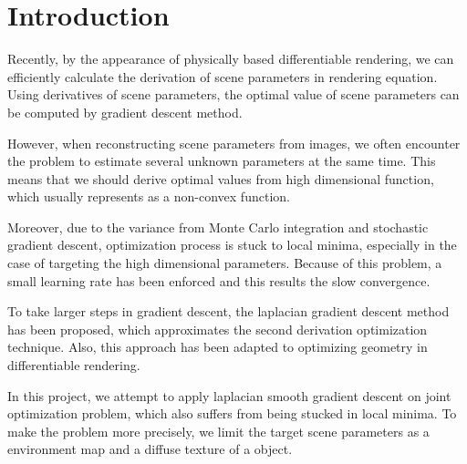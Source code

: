 \section*{Introduction}\label{ch:ch1label}

Recently, by the appearance of physically based differentiable rendering, we can efficiently calculate the derivation of scene parameters in rendering equation. Using derivatives of scene parameters, the optimal value of scene parameters can be computed by gradient descent method. 

However, when reconstructing scene parameters from images, we often encounter the problem to estimate several unknown parameters at the same time. This means that we should derive optimal values from high dimensional function, which usually represents as a non-convex function.

Moreover, due to the variance from Monte Carlo integration and stochastic gradient descent, optimization process is stuck to local minima, especially in the case of targeting the high dimensional parameters. Because of this problem, a small learning rate has been enforced and this results the slow convergence.

To take larger steps in gradient descent, the laplacian gradient descent method has been proposed, which approximates the second derivation optimization technique\cite{osher2018laplacian}.
Also, this approach has been adapted to optimizing geometry in differentiable rendering\cite{Nicolet2021Large}.

In this project, we attempt to apply laplacian smooth gradient descent on joint optimization problem, which also suffers from being stucked in local minima. To make the problem more precisely, we limit the target scene parameters as a environment map and a diffuse texture of a object.